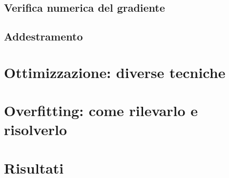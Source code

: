 \subsection{Verifica numerica del gradiente}
\subsection{Addestramento}


\section{Ottimizzazione: diverse tecniche}


\section{Overfitting: come rilevarlo e risolverlo}




\section{Risultati}
